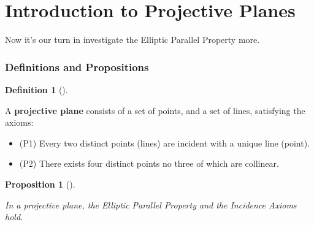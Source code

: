 \documentclass[
  twoside,
  12pt,
  letterpaper,
  fleqn]{article}
\providecommand{\tightlist}{%
  \setlength{\itemsep}{0pt}\setlength{\parskip}{0pt}}\usepackage{longtable,booktabs,array}
\theoremstyle{definition}
\newtheorem{definition}{Definition}[section]
\theoremstyle{definition}
\theoremstyle{plain}
\newtheorem{proposition}{Proposition}[section]
\theoremstyle{plain}
\theoremstyle{remark}
\begin{document}
\hypertarget{introduction-to-projective-planes}{%
\section{Introduction to Projective
Planes}\label{introduction-to-projective-planes}}

Now it's our turn in investigate the Elliptic Parallel Property more.

\hypertarget{definitions-and-propositions-1}{%
\subsubsection{Definitions and
Propositions}\label{definitions-and-propositions-1}}

\begin{definition}[]\protect\hypertarget{def-projective-plane}{}\label{def-projective-plane}

A \textbf{projective plane} consists of a set of points, and a set of
lines, satisfying the axioms:

\begin{itemize}
\tightlist
\item
  (P1) Every two distinct points (lines) are incident with a unique line
  (point).
\item
  (P2) There exists four distinct points no three of which are
  collinear.
\end{itemize}

\end{definition}

\begin{proposition}[]\protect\hypertarget{prp-twodispointpro}{}\label{prp-twodispointpro}

In a projective plane, the Elliptic Parallel Property and the Incidence
Axioms hold.

\end{proposition}
\end{document}
